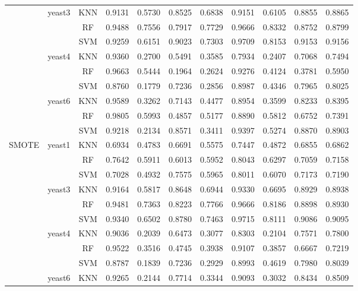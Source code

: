 \documentclass[sigconf]{acmart}
\begin{document}
\begin{table}[t]
\begin{tabular}{llccccccccc}
    \cmidrule{2-11}
    & \multirow{3}{*}{yeast3} & KNN & 0.9131 & 0.5730 & 0.8525 & 0.6838 & 0.9151 & 0.6105 & 0.8855 & 0.8865 \\
    & & RF & 0.9488 & 0.7556 & 0.7917 & 0.7729 & 0.9666 & 0.8332 & 0.8752 & 0.8799 \\
    & & SVM & 0.9259 & 0.6151 & 0.9023 & 0.7303 & 0.9709 & 0.8153 & 0.9153 & 0.9156 \\
    \cmidrule{2-11}
    & \multirow{3}{*}{yeast4} & KNN & 0.9360 & 0.2700 & 0.5491 & 0.3585 & 0.7934 & 0.2407 & 0.7068 & 0.7494 \\
    & & RF & 0.9663 & 0.5444 & 0.1964 & 0.2624 & 0.9276 & 0.4124 & 0.3781 & 0.5950 \\
    & & SVM & 0.8760 & 0.1779 & 0.7236 & 0.2856 & 0.8987 & 0.4346 & 0.7965 & 0.8025 \\
    \cmidrule{2-11}
    & \multirow{3}{*}{yeast6} & KNN & 0.9589 & 0.3262 & 0.7143 & 0.4477 & 0.8954 & 0.3599 & 0.8233 & 0.8395 \\
    & & RF & 0.9805 & 0.5993 & 0.4857 & 0.5177 & 0.8890 & 0.5812 & 0.6752 & 0.7391 \\
    & & SVM & 0.9218 & 0.2134 & 0.8571 & 0.3411 & 0.9397 & 0.5274 & 0.8870 & 0.8903 \\
    \midrule
    \multirow{12}{*}{SMOTE} & \multirow{3}{*}{yeast1} & KNN & 0.6934 & 0.4783 & 0.6691 & 0.5575 & 0.7447 & 0.4872 & 0.6855 & 0.6862 \\
    & & RF & 0.7642 & 0.5911 & 0.6013 & 0.5952 & 0.8043 & 0.6297 & 0.7059 & 0.7158 \\
    & & SVM & 0.7028 & 0.4932 & 0.7575 & 0.5965 & 0.8011 & 0.6070 & 0.7173 & 0.7190 \\
    \cmidrule{2-11}
    & \multirow{3}{*}{yeast3} & KNN & 0.9164 & 0.5817 & 0.8648 & 0.6944 & 0.9330 & 0.6695 & 0.8929 & 0.8938 \\
    & & RF & 0.9481 & 0.7363 & 0.8223 & 0.7766 & 0.9666 & 0.8186 & 0.8898 & 0.8930 \\
    & & SVM & 0.9340 & 0.6502 & 0.8780 & 0.7463 & 0.9715 & 0.8111 & 0.9086 & 0.9095 \\
    \cmidrule{2-11}
    & \multirow{3}{*}{yeast4} & KNN & 0.9036 & 0.2039 & 0.6473 & 0.3077 & 0.8303 & 0.2104 & 0.7571 & 0.7800 \\
    & & RF & 0.9522 & 0.3516 & 0.4745 & 0.3938 & 0.9107 & 0.3857 & 0.6667 & 0.7219 \\
    & & SVM & 0.8787 & 0.1839 & 0.7236 & 0.2929 & 0.8993 & 0.4619 & 0.7980 & 0.8039 \\
    \cmidrule{2-11}
    & \multirow{3}{*}{yeast6} & KNN & 0.9265 & 0.2144 & 0.7714 & 0.3344 & 0.9093 & 0.3032 & 0.8434 & 0.8509 \\

\end{tabular}
\end{table}
\end{document}
